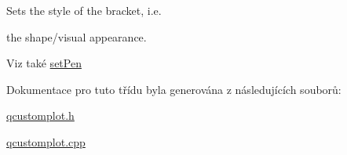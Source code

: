 Sets the style of the bracket, i.\+e. 

the shape/visual appearance.

\begin{DoxySeeAlso}{Viz také}
\hyperlink{classQCPItemBracket_ab13001d9cc5d8f9e56ea15bdda682acb}{set\+Pen} 
\end{DoxySeeAlso}


Dokumentace pro tuto třídu byla generována z následujících souborů\+:\begin{DoxyCompactItemize}
\item 
\hyperlink{qcustomplot_8h}{qcustomplot.\+h}\item 
\hyperlink{qcustomplot_8cpp}{qcustomplot.\+cpp}\end{DoxyCompactItemize}
